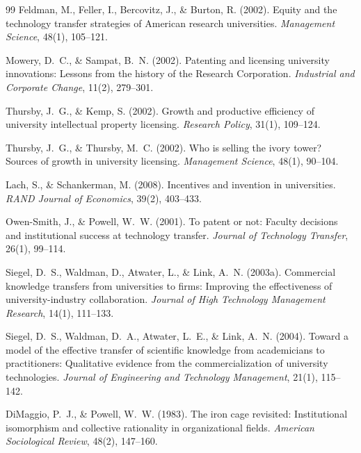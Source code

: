 \documentclass[12pt]{article}
\begin{document}
\begin{thebibliography}{99}
Feldman, M., Feller, I., Bercovitz, J., \& Burton, R. (2002). Equity and the technology
transfer strategies of American research universities. \textit{Management Science},
48(1), 105--121.

Mowery, D.~C., \& Sampat, B.~N. (2002). Patenting and licensing university innovations:
Lessons from the history of the Research Corporation. \textit{Industrial and Corporate
Change}, 11(2), 279--301.

Thursby, J.~G., \& Kemp, S. (2002). Growth and productive efficiency of university
intellectual property licensing. \textit{Research Policy}, 31(1), 109--124.

Thursby, J.~G., \& Thursby, M.~C. (2002). Who is selling the ivory tower? Sources of
growth in university licensing. \textit{Management Science}, 48(1), 90--104.

Lach, S., \& Schankerman, M. (2008). Incentives and invention in universities.
\textit{RAND Journal of Economics}, 39(2), 403--433.

Owen-Smith, J., \& Powell, W.~W. (2001). To patent or not: Faculty decisions and
institutional success at technology transfer. \textit{Journal of Technology Transfer},
26(1), 99--114.

Siegel, D.~S., Waldman, D., Atwater, L., \& Link, A.~N. (2003a). Commercial knowledge
transfers from universities to firms: Improving the effectiveness of university-industry
collaboration. \textit{Journal of High Technology Management Research}, 14(1), 111--133.

Siegel, D.~S., Waldman, D.~A., Atwater, L.~E., \& Link, A.~N. (2004). Toward a model
of the effective transfer of scientific knowledge from academicians to practitioners:
Qualitative evidence from the commercialization of university technologies. \textit{Journal
of Engineering and Technology Management}, 21(1), 115--142.

DiMaggio, P.~J., \& Powell, W.~W. (1983). The iron cage revisited: Institutional
isomorphism and collective rationality in organizational fields. \textit{American
Sociological Review}, 48(2), 147--160.


\end{thebibliography}
\end{document}
